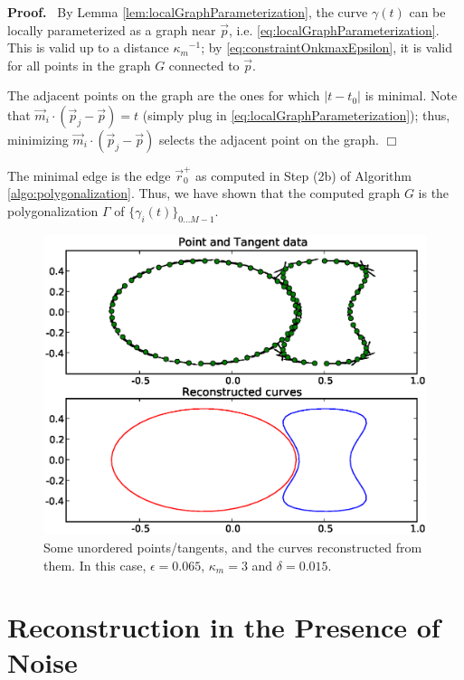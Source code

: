 \documentclass{article}
\newenvironment{proof}{
  \noindent\textbf{Proof.}\ }{\hspace*{\fill}
  \begin{math}\Box\end{math}\medskip}
\numberwithin{cntr}{section}
\numberwithin{equation}{section}
\newcommand{\abs}[1]{\left| #1 \right|}%
\newcommand{\vp}[0]{{\vec{p}}}
\newcommand{\vr}[0]{{\vec{r}}}
\newcommand{\vm}[0]{{\vec{m}}}
\newcommand{\Oto}[1]{{0 \ldots #1-1}}
\newcommand{\curveSet}{{ \{ \gamma_i(t) \}_{\Oto{M}}}}
\newcommand{\curvemax}{{\kappa_{m}}}
\newcommand{\curvemaxi}{{\curvemax^{-1}}}
\begin{document}
\begin{proof}
  By Lemma \ref{lem:localGraphParameterization}, the curve $\gamma(t)$ can be locally parameterized as a graph near $\vp$, i.e. \eqref{eq:localGraphParameterization}. This is valid up to a distance $\curvemaxi$; by \eqref{eq:constraintOnkmaxEpsilon}, it is valid for all points in the graph $G$ connected to $\vp$.

The adjacent points on the graph are the ones for which $\abs{t-t_{0}}$ is minimal. Note that $\vm_{i} \cdot (\vp_{j} - \vp) = t$ (simply plug in \eqref{eq:localGraphParameterization}); thus, minimizing $\vm_{i} \cdot (\vp_{j} - \vp)$ selects the adjacent point on the graph.
\end{proof}

The minimal edge is the edge $\vr^{+}_{0}$ as computed in Step (2b) of Algorithm \ref{algo:polygonalization}.
Thus, we have shown that the computed graph $G$ is the polygonalization
$\Gamma$ of $\curveSet$.

\begin{figure}
\setlength{\unitlength}{0.240900pt}
\ifx\plotpoint\undefined\newsavebox{\plotpoint}\fi
\sbox{\plotpoint}{\rule[-0.200pt]{0.400pt}{0.400pt}}%
\includegraphics[scale=0.5]{example1.eps}

\caption{Some unordered points/tangents, and the curves reconstructed from them. In this case, $\epsilon=0.065$, $\curvemax=3$ and $\delta=0.015$.}
\label{fig:basicExample}
\end{figure}

\section{Reconstruction in the Presence of Noise}
\end{document}
